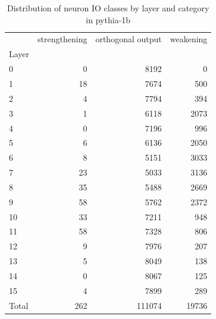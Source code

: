 \begin{table}
\caption{Distribution of neuron IO classes by layer and category in pythia-1b}
\label{tab:pythia-1b}
\begin{tabular}{lrrr}
 & strengthening & orthogonal output & weakening \\
Layer &  &  &  \\
0 & 0 & 8192 & 0 \\
1 & 18 & 7674 & 500 \\
2 & 4 & 7794 & 394 \\
3 & 1 & 6118 & 2073 \\
4 & 0 & 7196 & 996 \\
5 & 6 & 6136 & 2050 \\
6 & 8 & 5151 & 3033 \\
7 & 23 & 5033 & 3136 \\
8 & 35 & 5488 & 2669 \\
9 & 58 & 5762 & 2372 \\
10 & 33 & 7211 & 948 \\
11 & 58 & 7328 & 806 \\
12 & 9 & 7976 & 207 \\
13 & 5 & 8049 & 138 \\
14 & 0 & 8067 & 125 \\
15 & 4 & 7899 & 289 \\
Total & 262 & 111074 & 19736 \\
\end{tabular}
\end{table}
